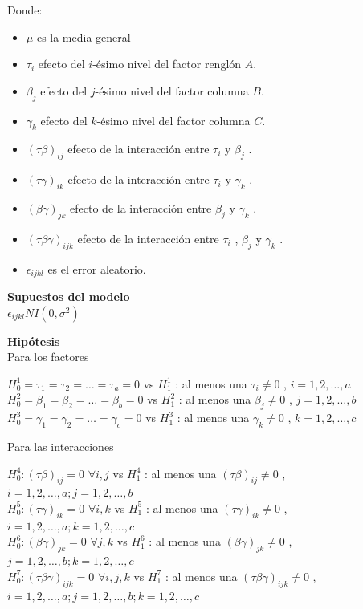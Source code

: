 Donde:
\begin{itemize}
	\item $\mu$ es la media general
	\item $\tau_{i}$ efecto del $i$-ésimo nivel del factor renglón $A$.
	\item $\beta_{j}$ efecto del $j$-ésimo nivel del factor columna $B$.
	\item $\gamma_{k} $ efecto del $k$-ésimo nivel del factor columna $C$.
	\item $(\tau \beta)_{ij} $ efecto de la interacción entre $\tau_{i}$  y  $\beta_{j}$ .
	\item $(\tau \gamma)_{ik}$ efecto de la interacción entre  $\tau_{i}$  y  $\gamma_{k}$ .
	\item $(\beta \gamma)_{jk}$ efecto de la interacción entre $\beta_{j}$ y  $\gamma_{k}$ .
	\item $(\tau \beta \gamma)_{ijk}$ efecto de la interacción entre $\tau_{i}$  , $\beta_{j}$ y $\gamma_{k}$ .
	\item $\epsilon_{ijkl}$ es el error aleatorio.
\end{itemize}


\textbf{Supuestos del modelo}\\
 $\epsilon_{ijkl} NI (0, \sigma^{2})$

\textbf{Hipótesis}\\
Para los factores
\begin{center}
	$H^{1}_{0} =\tau_{1} = \tau_{2} = \dots = \tau_{a} = 0$ vs $H^{1}_{1}$ : al menos una $\tau_{i} \neq 0$ , $i = 1,2, \dots, a$ \\
	$H^{2}_{0} =\beta_{1} = \beta_{2} = \dots = \beta_{b} = 0 $ vs $H^{2}_{1}$ : al menos una $\beta_{j} \neq 0$ , $j = 1,2, \dots,b$ \\
	$H^{3}_{0} =\gamma_{1} = \gamma_{2} = \dots = \gamma_{c} = 0 $ vs $H^{3}_{1}$ : al menos una $\gamma_{k} \neq 0$ , $k = 1,2, \dots,c$ \\
\end{center}

Para las interacciones 
\begin{center}
	$H^{4}_{0} : (\tau \beta)_{ij} = 0$ $ \forall i,j$ vs $H^{4}_{1}$ : al menos una $(\tau \beta)_{ij} \neq 0$ , $i = 1,2, \dots, a; j = 1,2, \dots,b$ \\
	$H^{5}_{0} : (\tau \gamma)_{ik} = 0$ $ \forall i,k$ vs $H^{5}_{1}$ : al menos una $(\tau \gamma)_{ik} \neq 0$ , $i = 1,2, \dots, a; k = 1,2, \dots,c$ \\
	$H^{6}_{0} : (\beta \gamma)_{jk} = 0$ $ \forall j,k$ vs $H^{6}_{1}$ : al menos una $(\beta \gamma)_{jk} \neq 0$ , $j = 1,2, \dots, b; k = 1,2, \dots, c$ \\
	$H^{7}_{0} : (\tau \beta \gamma)_{ijk} = 0$ $ \forall i,j,k$ vs $H^{7}_{1}$ : al menos una $(\tau \beta \gamma)_{ijk} \neq 0$ , $i = 1,2, \dots, a; j = 1,2, \dots, b; k = 1,2, \dots, c$ \\
\end{center}

